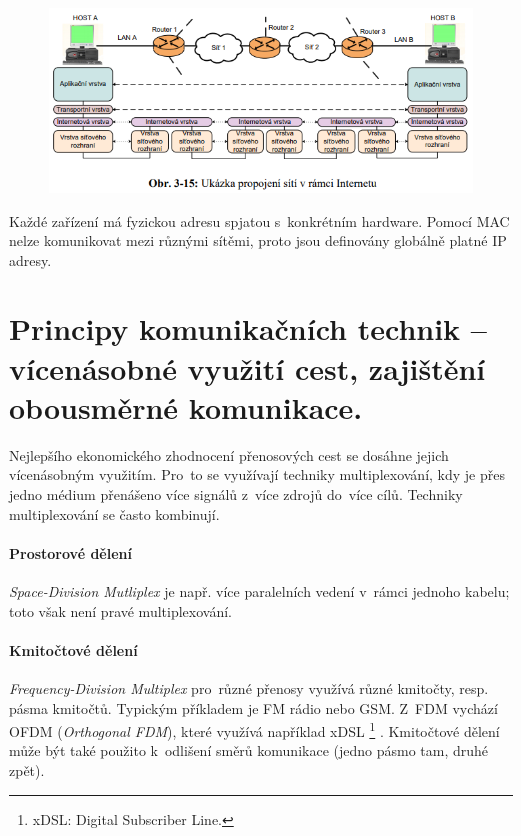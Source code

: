 \begin{figure}[ht]
	\centering
	\includegraphics[width=\textwidth]{images/q03_internet}
\end{figure}

Každé zařízení má fyzickou adresu spjatou s~konkrétním hardware. Pomocí MAC nelze komunikovat mezi různými sítěmi, proto jsou definovány globálně platné IP adresy.

\clearpage
\section{Principy komunikačních technik -- vícenásobné využití cest, zajištění obousměrné komunikace.}

Nejlepšího ekonomického zhodnocení přenosových cest se dosáhne jejich vícenásobným využitím. Pro~to se využívají techniky multiplexování, kdy je přes jedno médium přenášeno více signálů z~více zdrojů do~více cílů. Techniky multiplexování se často kombinují.

\paragraph{Prostorové dělení} \emph{Space-Division Mutliplex} je např. více paralelních vedení v~rámci jednoho kabelu; toto však není pravé multiplexování.

\paragraph{Kmitočtové dělení} \emph{Frequency-Division Multiplex} pro~různé přenosy využívá různé kmitočty, resp. pásma kmitočtů. Typickým příkladem je FM rádio nebo GSM. Z~FDM vychází OFDM (\emph{Orthogonal FDM}), které využívá například xDSL%
\footnote{xDSL: Digital Subscriber Line.}%
. Kmitočtové dělení může být také použito k~odlišení směrů komunikace (jedno pásmo tam, druhé zpět).

